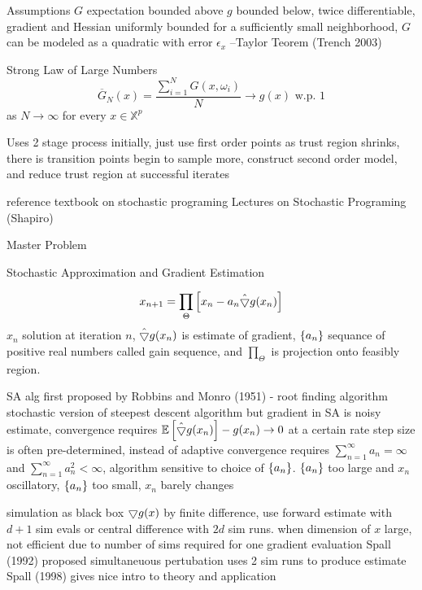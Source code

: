 Assumptions
$G$ expectation bounded above
$g$ bounded below, twice differentiable, gradient and Hessian uniformly bounded
for a sufficiently small neighborhood, $G$ can be modeled as a quadratic with error $\epsilon_x$ 
--Taylor Teorem (Trench 2003)

Strong Law of Large Numbers
\begin{equation}
\overline{G}_N (x) = \frac{ \sum_{i=1}^N G(x,\omega_i) }{N} \rightarrow g(x) \mbox{    w.p. 1}
\end{equation}
as $N \rightarrow \infty$ for every $x \in \mathbb{X}^p$

Uses 2 stage process
initially, just use first order points
as trust region shrinks, there is transition points
begin to sample more, construct second order model, and reduce trust region at successful iterates



reference textbook on stochastic programing
Lectures on Stochastic Programing (Shapiro) \cite{shapiro_2009}


Master Problem

Stochastic Approximation and Gradient Estimation

\begin{equation}
x_{n+1} = \prod_\Theta \left[ x_n - a_n \hat{\bigtriangledown} g(x_n) \right]
\end{equation}
$x_n$ solution at iteration $n$, $\hat{\bigtriangledown} g(x_n)$ is estimate of gradient, $\left\{ a_n \right\}$ sequance of positive real numbers called gain sequence, and $\prod_\Theta$ is projection onto feasibly region.

SA alg first proposed by Robbins and Monro (1951) - root finding algorithm
stochastic version of steepest descent algorithm
but gradient in SA is noisy estimate, convergence requires $\mathbb{E} \left[ \hat {\bigtriangledown} g(x_n) \right] - g(x_n) \rightarrow 0$ at a certain rate
step size is often pre-determined, instead of adaptive
convergence requires $\sum_{n=1}^\infty a_n = \infty$ and $\sum_{n=1}^\infty a_n^2 < \infty$, algorithm sensitive to choice of $\left\{ a_n \right\}$.  $\left\{ a_n \right\} $ too large and $x_n$ oscillatory, $\left\{ a_n \right\} $ too small, $x_n$ barely changes

simulation as black box $\bigtriangledown g(x)$ by finite difference, use forward estimate with $d+1$ sim evals or central difference with $2d$ sim runs.
when dimension of $x$ large, not efficient due to number of sims required for one gradient evaluation
Spall (1992) proposed simultaneuous pertubation uses 2 sim runs to produce estimate
Spall (1998) gives nice intro to theory and application

